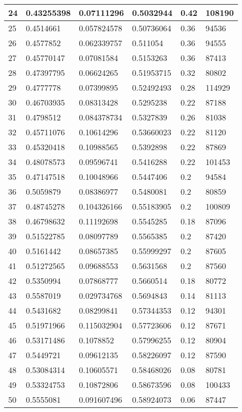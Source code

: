 \begin{longtable}{|l|l|l|l|l|l|}
24 & 0.43255398 & 0.07111296 & 0.5032944 & 0.42 & 108190 \\ \hline 
25 & 0.4514661 & 0.057824578 & 0.50736064 & 0.36 & 94536 \\ \hline 
26 & 0.4577852 & 0.062339757 & 0.511054 & 0.36 & 94555 \\ \hline 
27 & 0.45770147 & 0.07081584 & 0.5153263 & 0.36 & 87413 \\ \hline 
28 & 0.47397795 & 0.06624265 & 0.51953715 & 0.32 & 80802 \\ \hline 
29 & 0.4777778 & 0.07399895 & 0.52492493 & 0.28 & 114929 \\ \hline 
30 & 0.46703935 & 0.08313428 & 0.5295238 & 0.22 & 87188 \\ \hline 
31 & 0.4798512 & 0.084378734 & 0.5327839 & 0.26 & 81038 \\ \hline 
32 & 0.45711076 & 0.10614296 & 0.53660023 & 0.22 & 81120 \\ \hline 
33 & 0.45320418 & 0.10988565 & 0.5392898 & 0.22 & 87869 \\ \hline 
34 & 0.48078573 & 0.09596741 & 0.5416288 & 0.22 & 101453 \\ \hline 
35 & 0.47147518 & 0.10048966 & 0.5447406 & 0.2 & 94584 \\ \hline 
36 & 0.5059879 & 0.08386977 & 0.5480081 & 0.2 & 80859 \\ \hline 
37 & 0.48745278 & 0.104326166 & 0.55183905 & 0.2 & 100809 \\ \hline 
38 & 0.46798632 & 0.11192698 & 0.5545285 & 0.18 & 87096 \\ \hline 
39 & 0.51522785 & 0.08097789 & 0.5565385 & 0.2 & 87420 \\ \hline 
40 & 0.5161442 & 0.08657385 & 0.55999297 & 0.2 & 87605 \\ \hline 
41 & 0.51272565 & 0.09688553 & 0.5631568 & 0.2 & 87560 \\ \hline 
42 & 0.5350994 & 0.07868777 & 0.5660514 & 0.18 & 80772 \\ \hline 
43 & 0.5587019 & 0.029734768 & 0.5694843 & 0.14 & 81113 \\ \hline 
44 & 0.5431682 & 0.08299841 & 0.57344353 & 0.12 & 94301 \\ \hline 
45 & 0.51971966 & 0.115032904 & 0.57723606 & 0.12 & 87671 \\ \hline 
46 & 0.53171486 & 0.1078852 & 0.57996255 & 0.12 & 80904 \\ \hline 
47 & 0.5449721 & 0.09612135 & 0.58226097 & 0.12 & 87590 \\ \hline 
48 & 0.53084314 & 0.10605571 & 0.58468026 & 0.08 & 80781 \\ \hline 
49 & 0.53324753 & 0.10872806 & 0.58673596 & 0.08 & 100433 \\ \hline 
50 & 0.5555081 & 0.091607496 & 0.58924073 & 0.06 & 87447 \\ \hline 
\end{longtable}